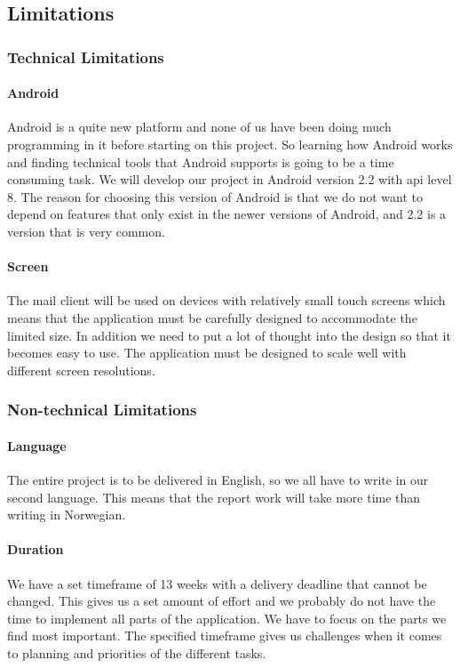 \subsection{Limitations}

\subsubsection{Technical Limitations}

\paragraph{Android}\hfill
\newline
Android is a quite new platform and none of us have been doing much programming in it before starting on this project. So learning how Android works and finding technical tools that Android supports is going to be a time consuming task. We will develop our project in Android version 2.2 with \gls{api} level 8. The reason for choosing this version of Android is that we do not want to depend on features that only exist in the newer versions of Android, and 2.2 is a version that is very common.

\paragraph{Screen}\hfill
\newline
The mail client will be used on devices with relatively small touch screens which means that the application must be carefully designed to accommodate the limited size. In addition we need to put a lot of thought into the design so that it becomes easy to use. The application must be designed to scale well with different screen resolutions.

\subsubsection{Non-technical Limitations}

\paragraph{Language}\hfill
\newline
The entire project is to be delivered in English, so we all have to write in our second language. This means that the report work will take more time than writing in Norwegian. 

\paragraph{Duration}\hfill
\newline
We have a set timeframe of 13 weeks with a delivery deadline that cannot be changed. This gives us a set amount of effort and we probably do not have the time to implement all parts of the application. We have to focus on the parts we find most important. The specified timeframe gives us challenges when it comes to planning and priorities of the different tasks.